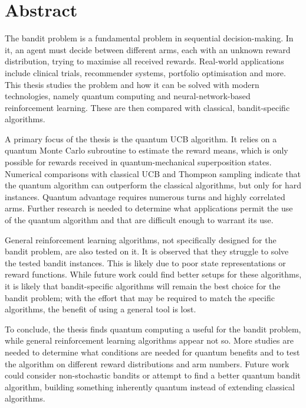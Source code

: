 \chapter{Abstract}

The bandit problem is a fundamental problem in sequential decision-making.
In it, an agent must decide between different arms, each with an unknown reward distribution, trying to maximise all received rewards.
Real-world applications include clinical trials, recommender systems, portfolio optimisation and more.
This thesis studies the problem and how it can be solved with modern technologies, namely quantum computing and neural-network-based reinforcement learning.
These are then compared with classical, bandit-specific algorithms.

A primary focus of the thesis is the quantum UCB algorithm.
It relies on a quantum Monte Carlo subroutine to estimate the reward means, which is only possible for rewards received in quantum-mechanical superposition states.
Numerical comparisons with classical UCB and Thompson sampling indicate that the quantum algorithm can outperform the classical algorithms, but only for hard instances.
Quantum advantage requires numerous turns and highly correlated arms.
Further research is needed to determine what applications permit the use of the quantum algorithm and that are difficult enough to warrant its use.

General reinforcement learning algorithms, not specifically designed for the bandit problem, are also tested on it.
It is observed that they struggle to solve the tested bandit instances.
This is likely due to poor state representations or reward functions.
While future work could find better setups for these algorithms, it is likely that bandit-specific algorithms will remain the best choice for the bandit problem; with the effort that may be required to match the specific algorithms, the benefit of using a general tool is lost.

To conclude, the thesis finds quantum computing a useful for the bandit problem, while general reinforcement learning algorithms appear not so.
More studies are needed to determine what conditions are needed for quantum benefits and to test the algorithm on different reward distributions and arm numbers.
Future work could consider non-stochastic bandits or attempt to find a better quantum bandit algorithm, building something inherently quantum instead of extending classical algorithms.

\cleardoublepage